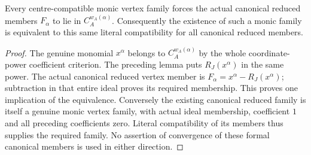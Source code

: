 \begin{theorem}
\label{hir:actual-canonical-centre-compatibility-iff-monic-family}
\leanok
Every centre-compatible monic vertex family forces the actual canonical
reduced members $F_\alpha$ to lie in $C_A^{w_A(\alpha)}$.
Consequently the existence of such a monic family is equivalent to this
same literal compatibility for all canonical reduced members.
\end{theorem}
\begin{proof}
The genuine monomial $x^\alpha$ belongs to $C_A^{w_A(\alpha)}$ by the
whole coordinate-power coefficient criterion. The preceding lemma puts
$R_J(x^\alpha)$ in the same power. The actual canonical reduced vertex
member is $F_\alpha=x^\alpha-R_J(x^\alpha)$; subtraction in that entire
ideal proves its required membership. This proves one implication of the
equivalence. Conversely the existing canonical reduced family is itself
a genuine monic vertex family, with actual ideal membership, coefficient
$1$ and all preceding coefficients zero. Literal compatibility of its
members thus supplies the required family. No assertion of convergence
of these formal canonical members is used in either direction.
\end{proof}

